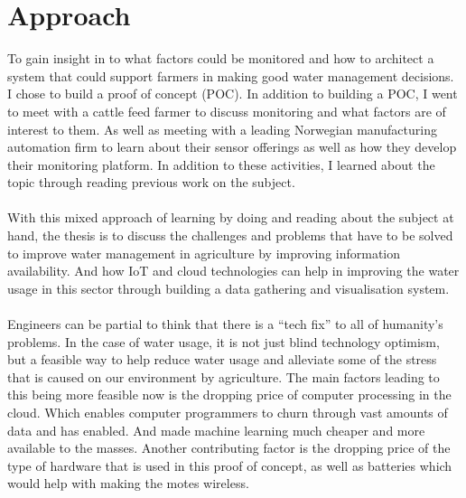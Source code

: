 \documentclass[]{uiophd}
\begin{document}
\section{Approach}
To gain insight in to what factors could be monitored and how to architect a system that could support farmers in making good water management decisions. I chose to build a proof of concept (POC). In addition to building a POC, I went to meet with a cattle feed farmer to discuss monitoring and what factors are of interest to them. As well as meeting with a leading Norwegian manufacturing automation firm to learn about their sensor offerings as well as how they develop their monitoring platform. In addition to these activities, I learned about the topic through reading previous work on the subject.
\\\\
With this mixed approach of learning by doing and reading about the subject at hand, the thesis is to discuss the challenges and problems that have to be solved to improve water management in agriculture by improving information availability. And how IoT and cloud technologies can help in improving the water usage in this sector through building a data gathering and visualisation system.
\\\\
Engineers can be partial to think that there is a “tech fix” to all of humanity's problems. In the case of water usage, it is not just blind technology optimism, but a feasible way to help reduce water usage and alleviate some of the stress that is caused on our environment by agriculture. The main factors leading to this being more feasible now is the dropping price of computer processing in the cloud. Which enables computer programmers to churn through vast amounts of data and has enabled. And made machine learning much cheaper and more available to the masses. Another contributing factor is the dropping price of the type of hardware that is used in this proof of concept, as well as batteries which would help with making the motes wireless.
\end{document}
